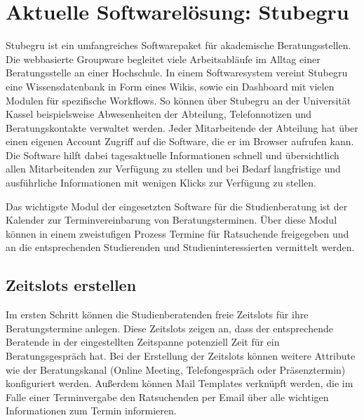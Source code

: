 \section{Aktuelle Softwarelösung: Stubegru}
Stubegru ist ein umfangreiches Softwarepaket für akademische Beratungsstellen.
Die webbasierte Groupware begleitet viele Arbeitsabläufe im Alltag einer
Beratungsstelle an einer Hochschule. In einem Softwaresystem vereint Stubegru
eine Wissensdatenbank in Form eines Wikis, sowie ein Dashboard mit vielen
Modulen für spezifische Workflows. So können über Stubegru an der Universität
Kassel beispielsweise Abwesenheiten der Abteilung, Telefonnotizen und
Beratungskontakte verwaltet werden. Jeder Mitarbeitende der Abteilung hat über
einen eigenen Account Zugriff auf die Software, die er im Browser aufrufen
kann. Die Software hilft dabei tagesaktuelle Informationen schnell und
übersichtlich allen Mitarbeitenden zur Verfügung zu stellen und bei Bedarf
langfristige und ausführliche Informationen mit wenigen Klicks zur Verfügung zu
stellen.\cite{stubegruWebsite}

Das wichtigste Modul der eingesetzten Software für die Studienberatung ist der
Kalender zur Terminvereinbarung von Beratungsterminen. Über diese Modul können
in einem zweistufigen Prozess Termine für Ratsuchende freigegeben und an die
entsprechenden Studierenden und Studieninteressierten vermittelt werden.

\subsection*{Zeitslots erstellen}
Im ersten Schritt können die Studienberatenden freie Zeitslots für ihre
Beratungstermine anlegen. Diese Zeitslots zeigen an, dass der entsprechende
Beratende in der eingestellten Zeitspanne potenziell Zeit für ein
Beratungsgespräch hat. Bei der Erstellung der Zeitslots können weitere
Attribute wie der Beratungskanal (Online Meeting, Telefongespräch oder
Präsenztermin) konfiguriert werden. Außerdem können Mail Templates verknüpft
werden, die im Falle einer Terminvergabe den Ratsuchenden per Email über alle
wichtigen Informationen zum Termin informieren.

